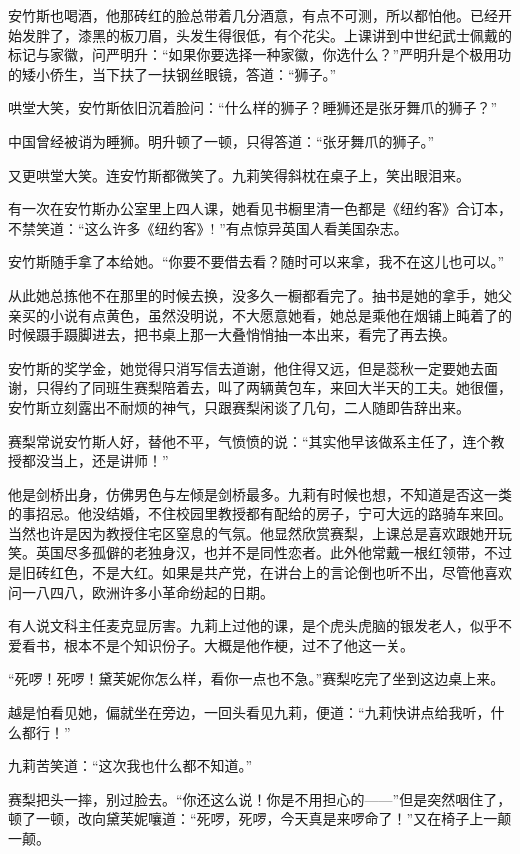 \par 安竹斯也喝酒，他那砖红的脸总带着几分酒意，有点不可测，所以都怕他。已经开始发胖了，漆黑的板刀眉，头发生得很低，有个花尖。上课讲到中世纪武士佩戴的标记与家徽，问严明升：“如果你要选择一种家徽，你选什么？”严明升是个极用功的矮小侨生，当下扶了一扶钢丝眼镜，答道：“狮子。”
\par 哄堂大笑，安竹斯依旧沉着脸问：“什么样的狮子？睡狮还是张牙舞爪的狮子？”
\par 中国曾经被诮为睡狮。明升顿了一顿，只得答道：“张牙舞爪的狮子。”
\par 又更哄堂大笑。连安竹斯都微笑了。九莉笑得斜枕在桌子上，笑出眼泪来。
\par 有一次在安竹斯办公室里上四人课，她看见书橱里清一色都是《纽约客》合订本，不禁笑道：“这么许多《纽约客》! ”有点惊异英国人看美国杂志。
\par 安竹斯随手拿了本给她。“你要不要借去看？随时可以来拿，我不在这儿也可以。”
\par 从此她总拣他不在那里的时候去换，没多久一橱都看完了。抽书是她的拿手，她父亲买的小说有点黄色，虽然没明说，不大愿意她看，她总是乘他在烟铺上盹着了的时候蹑手蹑脚进去，把书桌上那一大叠悄悄抽一本出来，看完了再去换。
\par 安竹斯的奖学金，她觉得只消写信去道谢，他住得又远，但是蕊秋一定要她去面谢，只得约了同班生赛梨陪着去，叫了两辆黄包车，来回大半天的工夫。她很僵，安竹斯立刻露出不耐烦的神气，只跟赛梨闲谈了几句，二人随即告辞出来。
\par 赛梨常说安竹斯人好，替他不平，气愤愤的说：“其实他早该做系主任了，连个教授都没当上，还是讲师！”
\par 他是剑桥出身，仿佛男色与左倾是剑桥最多。九莉有时候也想，不知道是否这一类的事招忌。他没结婚，不住校园里教授都有配给的房子，宁可大远的路骑车来回。当然也许是因为教授住宅区窒息的气氛。他显然欣赏赛梨，上课总是喜欢跟她开玩笑。英国尽多孤僻的老独身汉，也并不是同性恋者。此外他常戴一根红领带，不过是旧砖红色，不是大红。如果是共产党，在讲台上的言论倒也听不出，尽管他喜欢问一八四八，欧洲许多小革命纷起的日期。
\par 有人说文科主任麦克显厉害。九莉上过他的课，是个虎头虎脑的银发老人，似乎不爱看书，根本不是个知识份子。大概是他作梗，过不了他这一关。
\par “死啰！死啰！黛芙妮你怎么样，看你一点也不急。”赛梨吃完了坐到这边桌上来。
\par 越是怕看见她，偏就坐在旁边，一回头看见九莉，便道：“九莉快讲点给我听，什么都行！”
\par 九莉苦笑道：“这次我也什么都不知道。”
\par 赛梨把头一摔，别过脸去。“你还这么说！你是不用担心的——”但是突然咽住了，顿了一顿，改向黛芙妮嚷道：“死啰，死啰，今天真是来啰命了！”又在椅子上一颠一颠。
